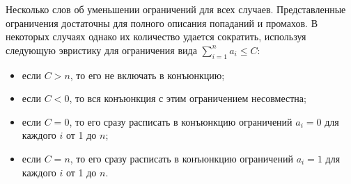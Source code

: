 %
%
%
%

Несколько слов об уменьшении ограничений для всех случаев.
Представленные ограничения достаточны для полного описания
попаданий и промахов. В некоторых случаях однако их
количество удается сократить, используя следующую эвристику для ограничения вида
$\sum_{i=1}^n a_i \leqslant C$:
\begin{itemize}
    \item если $C > n$, то его не включать в конъюнкцию;
    \item если $C < 0$, то вся конъюнкция с этим ограничением несовместна;
    \item если $C = 0$, то его сразу расписать в конъюнкцию ограничений
$a_i = 0$ для каждого $i$ от 1 до $n$;
    \item если $C = n$, то его сразу расписать в конъюнкцию ограничений
$a_i = 1$ для каждого $i$ от 1 до $n$.
\end{itemize}

